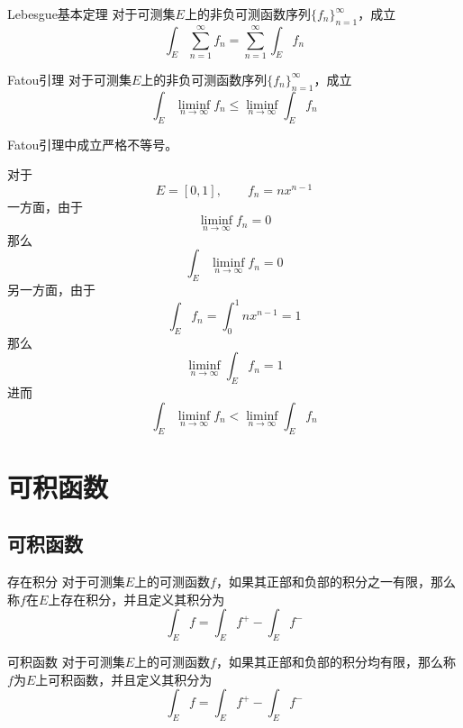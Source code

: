 \documentclass[lang = cn, scheme = chinese, thmcnt = section]{elegantbook}
\begin{document}
\begin{theorem}{Lebesgue基本定理}
	对于可测集$E$上的非负可测函数序列$\{ f_n \}_{n=1}^{\infty}$，成立
	$$
	\int_E \sum_{n=1}^{\infty}f_n=\sum_{n=1}^{\infty}\int_E f_n
	$$
\end{theorem}

\begin{theorem}{Fatou引理}
	对于可测集$E$上的非负可测函数序列$\{ f_n \}_{n=1}^{\infty}$，成立
	$$
	\int_E\liminf_{n\to\infty}f_n\le\liminf_{n\to\infty}\int_E f_n
	$$
\end{theorem}

\begin{example}
	Fatou引理中成立严格不等号。
\end{example}

\begin{solution}
	对于%
	$$
	E=[0,1],\qquad f_n=nx^{n-1}
	$$
	一方面，由于
	$$
	\liminf_{n\to\infty}f_n=0
	$$
	那么%
	$$
	\int_E\liminf_{n\to\infty}f_n=0
	$$
	另一方面，由于%
	$$
	\int_E f_n=\int_{0}^{1}nx^{n-1}=1
	$$
	那么%
	$$
	\liminf_{n\to\infty}\int_E f_n=1
	$$
	进而
	$$
	\int_E\liminf_{n\to\infty}f_n<\liminf_{n\to\infty}\int_E f_n
	$$
\end{solution}

\section{可积函数}

\subsection{可积函数}

\begin{definition}{存在积分}
	对于可测集$E$上的可测函数$f$，如果其正部和负部的积分之一有限，那么称$f$在$E$上存在积分，并且定义其积分为
	$$
	\int_Ef=\int_Ef^+-\int_Ef^-
	$$
\end{definition}

\begin{definition}{可积函数}
	对于可测集$E$上的可测函数$f$，如果其正部和负部的积分均有限，那么称$f$为$E$上可积函数，并且定义其积分为
	$$
	\int_Ef=\int_Ef^+-\int_Ef^-
	$$
\end{definition}
\end{document}
